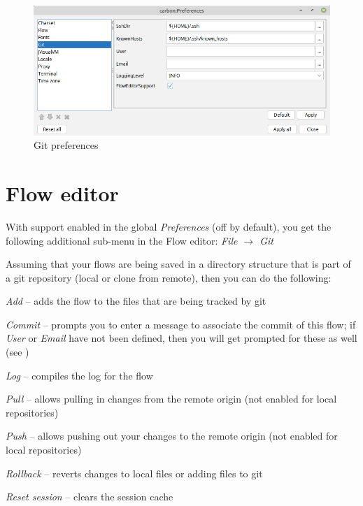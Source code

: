 \documentclass[a4paper]{book}
\begin{document}
\begin{figure}[htb]
  \centering
  \includegraphics[width=12.0cm]{images/preferences.png}
  \caption{Git preferences}
  \label{preferences}
\end{figure}


\section{Flow editor}
With support enabled in the global \textit{Preferences} (off by default), you get the following
additional sub-menu in the Flow editor: \textit{File $\rightarrow$ Git}

Assuming that your flows are being saved in a directory structure that is part of a git
repository (local or clone from remote), then you can do the following:
\begin{tight_itemize}
    \item \textit{Add} -- adds the flow to the files that are being tracked by git
    \item \textit{Commit} -- prompts you to enter a message to associate the commit of this flow;
    if \textit{User} or \textit{Email} have not been defined, then you will get prompted
    for these as well (see \cite{git-config})
    \item \textit{Log} -- compiles the log for the flow
    \item \textit{Pull} -- allows pulling in changes from the remote origin (not enabled for local repositories)
    \item \textit{Push} -- allows pushing out your changes to the remote origin (not enabled for local repositories)
    \item \textit{Rollback} -- reverts changes to local files or adding files to git
    \item \textit{Reset session} -- clears the session cache
\end{tight_itemize}



\end{document}
